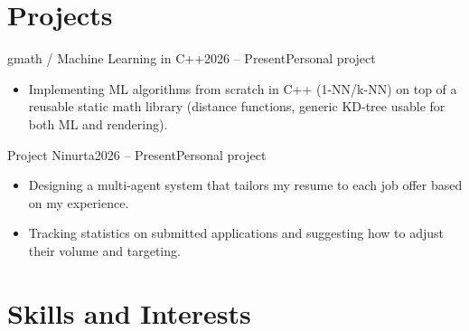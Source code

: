 \documentclass[english]{resume}
\begin{document}
\section{Projects}
  {gmath / Machine Learning in C++}{2026 -- Present}{Personal project}
\begin{itemize}
  \item Implementing ML algorithms from scratch in C++ (1-NN/k-NN) on top of a reusable static math library (distance functions, generic KD-tree usable for both ML and rendering).
\end{itemize}
  {Project Ninurta}{2026 -- Present}{Personal project}
\begin{itemize}
  \item Designing a multi-agent system that tailors my resume to each job offer based on my experience.
  \item Tracking statistics on submitted applications and suggesting how to adjust their volume and targeting.
\end{itemize}

\section{Skills and Interests}
\begin{cvskills}
\end{cvskills}
\end{document}
